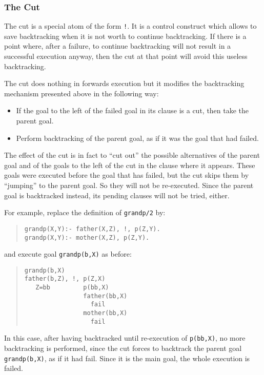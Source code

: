 \subsubsection{The Cut}

The cut is a special atom of the form \verb+!+. It is a control
construct which allows to save backtracking when it is not worth to
continue backtracking. If there is a point where, after a failure, to
continue backtracking will not result in a successful execution
anyway, then the cut at that point will avoid this useless
backtracking. 

The cut does nothing in forwards execution but it modifies the
backtracking mechanism presented above in the following way:
\begin{itemize}
\item If the goal to the left of the failed goal in its clause is a
  cut, then take the parent goal.
\item Perform backtracking of the parent goal, as if it was the goal
  that had failed.
\end{itemize}

The effect of the cut is in fact to ``cut out'' the possible alternatives
of the parent goal and of the goals to the left of the cut in the clause
where it appears. These goals were executed before the goal that has
failed, but the cut skips them by ``jumping'' to the parent goal. So
they will not be re-executed. Since the parent goal is backtracked instead,
its pending clauses will not be tried, either.

For example, replace the definition of \verb+grandp/2+ by:
\begin{quote}
\begin{verbatim}
grandp(X,Y):- father(X,Z), !, p(Z,Y).
grandp(X,Y):- mother(X,Z), p(Z,Y).
\end{verbatim}
\end{quote}
%
and execute goal \verb+grandp(b,X)+ as before:
\begin{quote}
\begin{verbatim}
grandp(b,X)
father(b,Z), !, p(Z,X)
   Z=bb         p(bb,X)
                father(bb,X)
                  fail
                mother(bb,X)
                  fail
\end{verbatim}
\end{quote}
%
In this case, after having backtracked until re-execution of
\verb+p(bb,X)+, no more backtracking is performed, since the cut
forces to backtrack the parent goal \verb+grandp(b,X)+, as if it had
fail. Since it is the main goal, the whole execution is failed.

